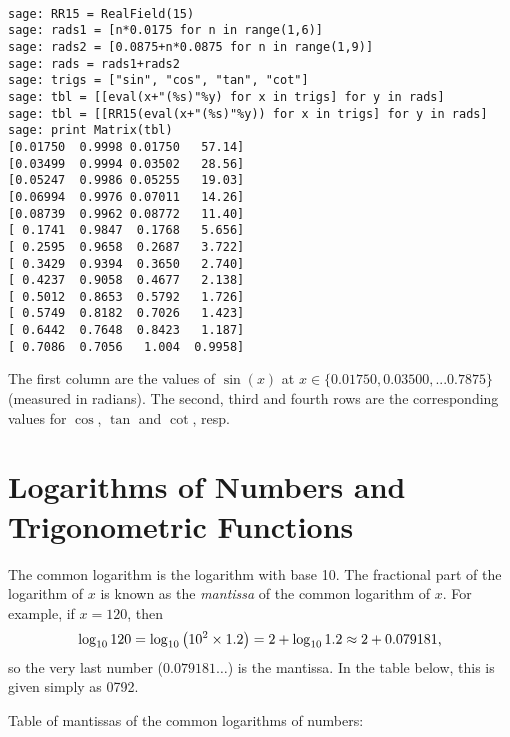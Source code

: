 \begin{Verbatim}[fontsize=\scriptsize,fontfamily=courier,fontshape=tt,frame=single,label=\SAGE]

sage: RR15 = RealField(15)
sage: rads1 = [n*0.0175 for n in range(1,6)]
sage: rads2 = [0.0875+n*0.0875 for n in range(1,9)]
sage: rads = rads1+rads2
sage: trigs = ["sin", "cos", "tan", "cot"]
sage: tbl = [[eval(x+"(%s)"%y) for x in trigs] for y in rads]
sage: tbl = [[RR15(eval(x+"(%s)"%y)) for x in trigs] for y in rads]
sage: print Matrix(tbl)
[0.01750  0.9998 0.01750   57.14]
[0.03499  0.9994 0.03502   28.56]
[0.05247  0.9986 0.05255   19.03]
[0.06994  0.9976 0.07011   14.26]
[0.08739  0.9962 0.08772   11.40]
[ 0.1741  0.9847  0.1768   5.656]
[ 0.2595  0.9658  0.2687   3.722]
[ 0.3429  0.9394  0.3650   2.740]
[ 0.4237  0.9058  0.4677   2.138]
[ 0.5012  0.8653  0.5792   1.726]
[ 0.5749  0.8182  0.7026   1.423]
[ 0.6442  0.7648  0.8423   1.187]
[ 0.7086  0.7056   1.004  0.9958]

\end{Verbatim}

\noindent
The first column are the values of $\sin(x)$ at 
$x\in \{0.01750, 0.03500, ... %
0.7875\}$ (measured in radians). The second, third and fourth 
rows are the corresponding values for $\cos$, $\tan$ and $\cot$,
resp.

\section{Logarithms of Numbers and Trigonometric Functions}
\label{sec:1:5:logarithms-of-numbers-and-trigonometric-functions}

The common logarithm is the logarithm with base 10. The fractional part of the logarithm of $x$ is known as the \emph{mantissa} of the common logarithm of $x$. For example, if $x=120$, then
\[
\log_{10}120 = \log_{10}\left(10^2 \times 1.2\right) = 2 + \log_{10}1.2 \approx 2 + 0.079181\textnormal{,}
\]
so the very last number ($0.079181\ldots$) is the mantissa. In the table below, this is given simply as 0792.

Table of mantissas of the common logarithms of numbers:

